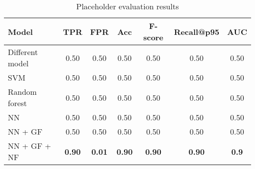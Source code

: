 \begin{table}[]
\centering
\begin{tabular}{@{}lcccccc@{}}
\toprule
\textbf{Model}           & \textbf{TPR} & \textbf{FPR}  & \textbf{Acc} & \textbf{F-score} & \textbf{Recall@p95} & \textbf{AUC} \\ \midrule
Different model & 0.50 & 0.50  & 0.50 & 0.50     & 0.50        & 0.50 \\
SVM             & 0.50 & 0.50  & 0.50 & 0.50     & 0.50        & 0.50 \\
Random forest   & 0.50 & 0.50  & 0.50 & 0.50     & 0.50        & 0.50 \\
NN              & 0.50 & 0.50  & 0.50 & 0.50     & 0.50        & 0.50 \\
NN + GF         & 0.50 & 0.50  & 0.50 & 0.50     & 0.50        & 0.50 \\
NN + GF + NF    & \textbf{0.90} & \textbf{0.01} & \textbf{0.90} & \textbf{0.90}     & \textbf{0.90}        & \textbf{0.9} \\ \bottomrule
\end{tabular}
\caption{Placeholder evaluation results}
\label{tab:results}
\end{table}